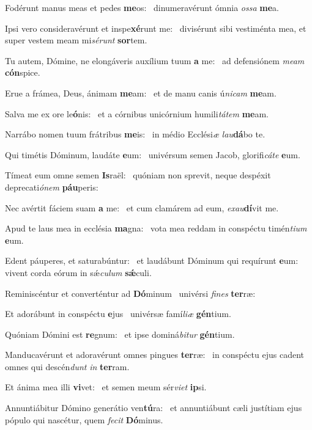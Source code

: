 \item Fodérunt manus meas et pedes \textbf{me}os:~\psstar{} dinumeravérunt ómnia \textit{ossa} \textbf{me}a.
\item Ipsi vero consideravérunt et inspe\textbf{xé}runt me:~\psstar{} divisérunt sibi vestiménta mea, et super vestem meam mi\textit{sérunt} \textbf{sor}tem.
\item Tu autem, Dómine, ne elongáveris auxílium tuum \textbf{a} me:~\psstar{} ad defensiónem \textit{meam} \textbf{cón}spice.
\item Erue a frámea, Deus, ánimam \textbf{me}am:~\psstar{} et de manu canis ú\textit{nicam} \textbf{me}am.
\item Salva me ex ore le\textbf{ó}nis:~\psstar{} et a córnibus unicórnium humili\textit{tátem} \textbf{me}am.
\item Narrábo nomen tuum frátribus \textbf{me}is:~\psstar{} in médio Ecclési\textit{æ} \textit{lau}\textbf{dá}bo te.
\item Qui timétis Dóminum, laudáte \textbf{e}um:~\psstar{} univérsum semen Jacob, glorifi\textit{cáte} \textbf{e}um.
\item Tímeat eum omne semen \textbf{Is}raël:~\psstar{} quóniam non sprevit, neque despéxit deprecati\textit{ónem} \textbf{páu}peris:
\item Nec avértit fáciem suam \textbf{a} me:~\psstar{} et cum clamárem ad eum, \textit{exau}\textbf{dí}vit me.
\item Apud te laus mea in ecclésia \textbf{ma}gna:~\psstar{} vota mea reddam in conspéctu timén\textit{tium} \textbf{e}um.
\item Edent páuperes, et saturabúntur:~\pscross{} et laudábunt Dóminum qui requírunt \textbf{e}um:~\psstar{} vivent corda eórum in sǽ\textit{culum} \textbf{sǽ}culi.
\item Reminiscéntur et converténtur ad \textbf{Dó}minum~\psstar{} univérsi \textit{fines} \textbf{ter}ræ:
\item Et adorábunt in conspéctu \textbf{e}jus~\psstar{} univérsæ famí\textit{liæ} \textbf{gén}tium.
\item Quóniam Dómini est \textbf{re}gnum:~\psstar{} et ipse dominá\textit{bitur} \textbf{gén}tium.
\item Manducavérunt et adoravérunt omnes pingues \textbf{ter}ræ:~\psstar{} in conspéctu ejus cadent omnes qui descén\textit{dunt} \textit{in} \textbf{ter}ram.
\item Et ánima mea illi \textbf{vi}vet:~\psstar{} et semen meum sér\textit{viet} \textbf{ip}si.
\item Annuntiábitur Dómino generátio ven\textbf{tú}ra:~\psstar{} et annuntiábunt cæli justítiam ejus pópulo qui nascétur, quem \textit{fecit} \textbf{Dó}minus.
